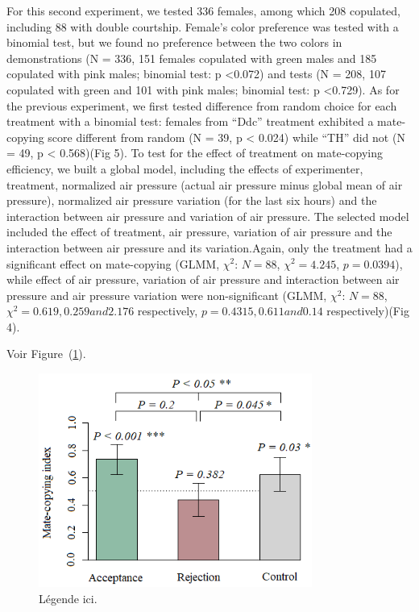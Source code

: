 \documentclass[a4paper, 12pt]{article}
\begin{document}
For this second experiment, we tested 336 females, among which 208 copulated, including 88 with double courtship. Female's color preference was tested with a binomial test, but we found no preference between the two colors in demonstrations (N = 336, 151 females copulated with green males and 185 copulated with pink males; binomial test: p {\textless}0.072) and tests (N = 208, 107 copulated with green and 101 with pink males; binomial test: p {\textless}0.729).
As for the previous experiment, we first tested difference from random choice for each treatment with a binomial test: females from ``Ddc'' treatment exhibited a mate-copying score different from random (N = 39, p {\textless} 0.024) while ``TH'' did not (N = 49, p {\textless} 0.568)(Fig 5).
To test for the effect of treatment on mate-copying efficiency, we built a global model, including the effects of experimenter, treatment, normalized air pressure (actual air pressure minus global mean of air pressure), normalized air pressure variation (for the last six hours) and the interaction between air pressure and variation of air pressure. The selected model included the effect of treatment, air pressure, variation of air pressure and the interaction between air pressure and its variation.Again, only the treatment had a significant effect on mate-copying (GLMM, $\chi^2$: $N = 88$, $\chi^2 = 4.245$, $p = 0.0394$), while effect of air pressure, variation of air pressure and interaction between air pressure and air pressure variation were non-significant (GLMM, $\chi^2$: $N = 88$, $\chi^2 = 0.619, 0.259 and 2.176$ respectively, $p = 0.4315, 0.611 and 0.14$ respectively)(Fig 4).

	
	
	 
	Voir Figure~(\ref{fig:mcsar}).
 


	\begin{figure}
	\centering
	\includegraphics[width=0.8\textwidth]{images/mcsar}
	\caption{Légende ici.}
	\label{fig:mcsar}
\end{figure}


\clearpage
\newrefcontext[sorting=nyt] %
\printbibliography
 
\end{document}
